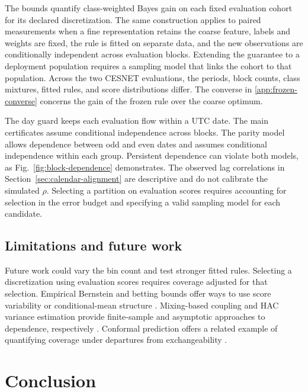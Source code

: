 \documentclass[preprint,11pt]{elsarticle}
\begin{document}
The bounds quantify class-weighted Bayes gain on each fixed evaluation cohort for its declared discretization. The same construction applies to paired measurements when a fine representation retains the coarse feature, labels and weights are fixed, the rule is fitted on separate data, and the new observations are conditionally independent across evaluation blocks. Extending the guarantee to a deployment population requires a sampling model that links the cohort to that population. Across the two CESNET evaluations, the periods, block counts, class mixtures, fitted rules, and score distributions differ. The converse in \ref{app:frozen-converse} concerns the gain of the frozen rule over the coarse optimum.

The day guard keeps each evaluation flow within a UTC date. The main certificates assume conditional independence across blocks. The parity model allows dependence between odd and even dates and assumes conditional independence within each group. Persistent dependence can violate both models, as Fig.~\ref{fig:block-dependence} demonstrates. The observed lag correlations in Section~\ref{sec:calendar-alignment} are descriptive and do not calibrate the simulated $\rho$. Selecting a partition on evaluation scores requires accounting for selection in the error budget and specifying a valid sampling model for each candidate.

\subsection{Limitations and future work}

Future work could vary the bin count and test stronger fitted rules. Selecting a discretization using evaluation scores requires coverage adjusted for that selection. Empirical Bernstein and betting bounds offer ways to use score variability or conditional-mean structure \cite{maurer2009bernstein,waudby2024betting}. Mixing-based coupling and HAC variance estimation provide finite-sample and asymptotic approaches to dependence, respectively \cite{yu1994mixing,newey1987hac}. Conformal prediction offers a related example of quantifying coverage under departures from exchangeability \cite{barber2023beyond}.

\section{Conclusion}
\end{document}
